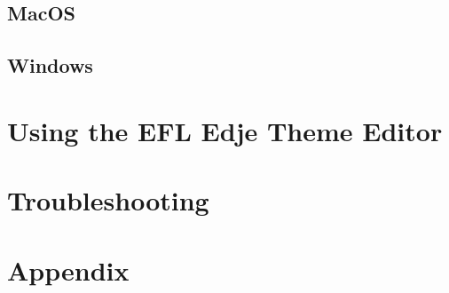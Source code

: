 \documentclass[titlepage,oneside,11pt]{book}
\begin{document}
\section{MacOS}
\newpage
\section{Windows}
\chapter{Using the EFL Edje Theme Editor}
\chapter{Troubleshooting}
\chapter{Appendix}
\end{document}
